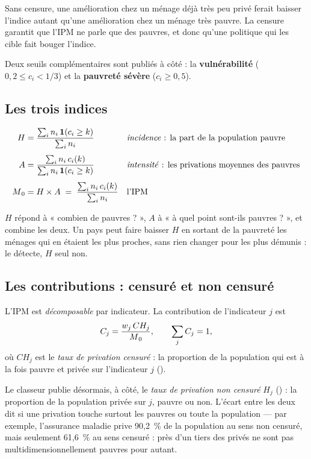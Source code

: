 \documentclass[11pt,a4paper]{article}
\begin{document}
\begin{retenir}
Sans censure, une amélioration chez un ménage déjà très peu privé ferait baisser l'indice autant
qu'une amélioration chez un ménage très pauvre. La censure garantit que l'IPM ne parle que des
pauvres, et donc qu'une politique qui les cible fait bouger l'indice.
\end{retenir}

Deux seuils complémentaires sont publiés à côté : la \textbf{vulnérabilité}
($0{,}2 \le c_i < 1/3$) et la \textbf{pauvreté sévère} ($c_i \ge 0{,}5$).

\subsection{Les trois indices}

\begin{align}
H  &= \frac{\sum_i n_i \, \mathbf{1}(c_i \ge k)}{\sum_i n_i}
   && \text{\emph{incidence} : la part de la population pauvre} \\[4pt]
A  &= \frac{\sum_i n_i \, c_i(k)}{\sum_i n_i \, \mathbf{1}(c_i \ge k)}
   && \text{\emph{intensité} : les privations moyennes des pauvres} \\[4pt]
M\textsubscript{0} &= H \times A \;=\; \frac{\sum_i n_i \, c_i(k)}{\sum_i n_i}
   && \text{l'IPM}
\end{align}

$H$ répond à « combien de pauvres ? », $A$ à « à quel point sont-ils pauvres ? », et \ipm{} combine
les deux. Un pays peut faire baisser $H$ en sortant de la pauvreté les ménages qui en étaient les
plus proches, sans rien changer pour les plus démunis : \ipm{} le détecte, $H$ seul non.

\subsection{Les contributions : censuré et non censuré}
\label{sec:contributions}

L'IPM est \emph{décomposable} par indicateur. La contribution de l'indicateur $j$ est
\[
C_j = \frac{w_j \, CH_j}{M\textsubscript{0}}, \qquad \sum_j C_j = 1,
\]
où $CH_j$ est le \emph{taux de privation censuré} : la proportion de la population qui est à la
fois pauvre et privée sur l'indicateur $j$ ().

Le classeur publie désormais, à côté, le \emph{taux de privation non censuré} $H_j$
() : la proportion de la population privée sur $j$, pauvre ou
non. L'écart entre les deux dit si une privation touche surtout les pauvres ou toute la
population --- par exemple, l'assurance maladie prive 90,2~\% de la population au sens non
censuré, mais seulement 61,6~\% au sens censuré : près d'un tiers des privés ne sont pas
multidimensionnellement pauvres pour autant.
\end{document}
